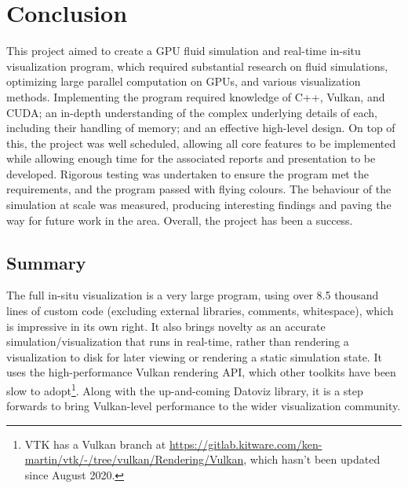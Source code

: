 
\chapter{Conclusion}
\label{sec:Conclusion} 





This project aimed to create a GPU fluid simulation and real-time in-situ visualization program, which required substantial research on fluid simulations, optimizing large parallel computation on GPUs, and various visualization methods.
Implementing the program required knowledge of C++, Vulkan, and CUDA; an in-depth understanding of the complex underlying details of each, including their handling of memory; and an effective high-level design.
On top of this, the project was well scheduled, allowing all core features to be implemented while allowing enough time for the associated reports and presentation to be developed.
Rigorous testing was undertaken to ensure the program met the requirements, and the program passed with flying colours.
The behaviour of the simulation at scale was measured, producing interesting findings and paving the way for future work in the area.
Overall, the project has been a success.

\section{Summary}
The full in-situ visualization is a very large program, using over 8.5 thousand lines of custom code (excluding external libraries, comments, whitespace), which is impressive in its own right.
It also brings novelty as an accurate simulation/visualization that runs in real-time, rather than rendering a visualization to disk for later viewing or rendering a static simulation state.
It uses the high-performance Vulkan rendering API, which other toolkits have been slow to adopt\footnote{VTK has a Vulkan branch at \url{https://gitlab.kitware.com/ken-martin/vtk/-/tree/vulkan/Rendering/Vulkan}, which hasn't been updated since August 2020.}.
Along with the up-and-coming Datoviz library\cite{Datoviz}, it is a step forwards to bring Vulkan-level performance to the wider visualization community.

